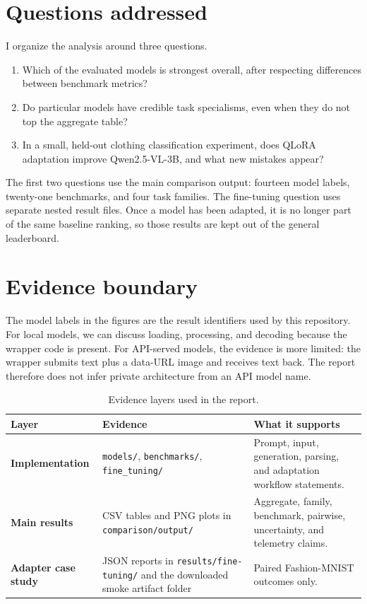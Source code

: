 \documentclass[11pt,a4paper]{report}
\newcommand{\code}[1]{\texttt{#1}}
\begin{document}
\section{Questions addressed}
I organize the analysis around three questions.

\begin{enumerate}[leftmargin=22pt]
\item Which of the evaluated models is strongest overall, after respecting
      differences between benchmark metrics?
\item Do particular models have credible task specialisms, even when they do
      not top the aggregate table?
\item In a small, held-out clothing classification experiment, does QLoRA
      adaptation improve Qwen2.5-VL-3B, and what new mistakes appear?
\end{enumerate}

The first two questions use the main comparison output: fourteen model labels,
twenty-one benchmarks, and four task families.  The fine-tuning question uses
separate nested result files.  Once a model has been adapted, it is no longer
part of the same baseline ranking, so those results are kept out of the general
leaderboard.

\section{Evidence boundary}
The model labels in the figures are the result identifiers used by this
repository.  For local models, we can discuss loading, processing, and decoding
because the wrapper code is present.  For API-served models, the evidence is
more limited: the wrapper submits text plus a data-URL image and receives text
back.  The report therefore does not infer private architecture from an API
model name.

\begin{table}[H]
\centering
\caption{Evidence layers used in the report.}
\begin{tabularx}{\textwidth}{>{\bfseries}p{32mm} X X}
\toprule
Layer & Evidence & What it supports \\
\midrule
Implementation & \code{models/}, \code{benchmarks/}, \code{fine\_tuning/} &
Prompt, input, generation, parsing, and adaptation workflow statements. \\
Main results & CSV tables and PNG plots in \code{comparison/output/} &
Aggregate, family, benchmark, pairwise, uncertainty, and telemetry claims. \\
Adapter case study & JSON reports in \code{results/fine-tuning/} and the
downloaded smoke artifact folder & Paired Fashion-MNIST outcomes only. \\
\bottomrule
\end{tabularx}
\end{table}
\end{document}

